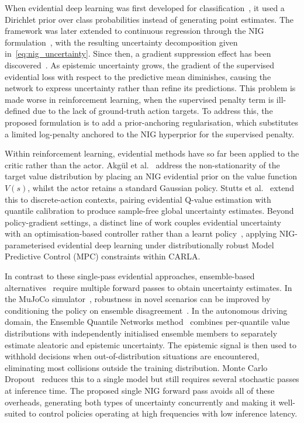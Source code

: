 \documentclass{sig-alternate}
\begin{document}
When evidential deep learning was first developed for classification~\cite{sensoy2018evidential}, it used a Dirichlet prior over class probabilities instead of generating point estimates. The framework was later extended to continuous regression through the NIG formulation~\cite{amini2020deep}, with the resulting uncertainty decomposition given in~\cref{eq:nig_uncertainty}. Since then, a gradient suppression effect has been discovered~\cite{oh2022improving}. As epistemic uncertainty grows, the gradient of the supervised evidential loss with respect to the predictive mean diminishes, causing the network to express uncertainty rather than refine its predictions. This problem is made worse in reinforcement learning, when the supervised penalty term is ill-defined due to the lack of ground-truth action targets. To address this, the proposed formulation is to add a prior-anchoring regularisation, which substitutes a limited log-penalty anchored to the NIG hyperprior for the supervised penalty.

Within reinforcement learning, evidential methods have so far been applied to the critic rather than the actor. Akg\"{u}l et al.~\cite{akgul2025eppo} address the non-stationarity of the target value distribution by placing an NIG evidential prior on the value function $V(s)$, whilst the actor retains a standard Gaussian policy. Stutts et al.~\cite{stutts2024ceqr} extend this to discrete-action contexts, pairing evidential Q-value estimation with quantile calibration to produce sample-free global uncertainty estimates. Beyond policy-gradient settings, a distinct line of work couples evidential uncertainty with an optimisation-based controller rather than a learnt policy~\cite{ham2025dro}, applying NIG-parameterised evidential deep learning under distributionally robust Model Predictive Control (MPC) constraints within CARLA.

In contrast to these single-pass evidential approaches, ensemble-based alternatives~\cite{lakshminarayanan2017ensembles} require multiple forward passes to obtain uncertainty estimates. In the MuJoCo simulator~\cite{todorov2012mujoco}, robustness in novel scenarios can be improved by conditioning the policy on ensemble disagreement~\cite{kim2022unicon}. In the autonomous driving domain, the Ensemble Quantile Networks method~\cite{hoel2023ensemble} combines per-quantile value distributions with independently initialised ensemble members to separately estimate aleatoric and epistemic uncertainty. The epistemic signal is then used to withhold decisions when out-of-distribution situations are encountered, eliminating most collisions outside the training distribution. Monte Carlo Dropout~\cite{gal2016dropout} reduces this to a single model but still requires several stochastic passes at inference time. The proposed single NIG forward pass avoids all of these overheads, generating both types of uncertainty concurrently and making it well-suited to control policies operating at high frequencies with low inference latency.
\end{document}

